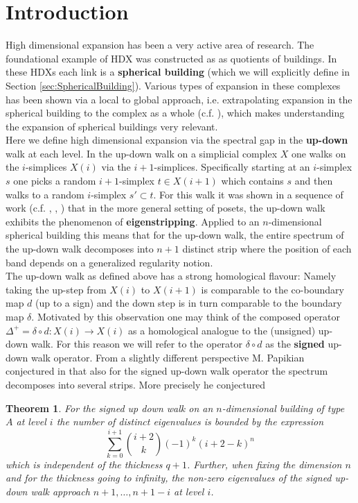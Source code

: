 \documentclass[11pt]{amsart}
\newtheorem{theorem}{Theorem}[section]
\begin{document}
    \section{Introduction}
    High dimensional expansion  has been a very active area of research. The foundational example of HDX was constructed as \cite{LSV05} as quotients of buildings. In these HDXs each link is a \textbf{spherical building} (which we will explicitly define in Section \ref{sec:SphericalBuilding}). Various types of expansion in these complexes has been shown via a local to global approach, i.e. extrapolating expansion in the spherical building to the complex as a whole (c.f. \cite{EK17}), which makes understanding the expansion of spherical buildings very relevant. \\
    Here we define high dimensional expansion via the spectral gap in the \textbf{up-down} walk at each level. In the up-down walk on a simplicial complex $X$ one walks on the $i$-simplices $X(i)$ via the $i+1$-simplices. Specifically starting at an $i$-simplex $s$ one picks a random $i+1$-simplex $t\in X(i+1)$ which contains $s$ and then walks to a random $i$-simplex $s'\subset t$. For this walk  it was shown in a sequence of work (c.f. \cite{DDFH18}, \cite{KO21b}, \cite{Eigen23}) that in the more general setting of posets, the up-down walk exhibits the phenomenon of \textbf{eigenstripping}. Applied to an $n$-dimensional spherical building  this means that for the up-down walk,  the entire spectrum of the up-down walk decomposes into $n+1$ distinct strip where the position of each band depends on a generalized regularity notion.\\
    The up-down walk as defined above has a strong homological flavour: Namely taking the up-step from $X(i)$ to $X(i+1)$ is comparable to the co-boundary map $d$ (up to a sign) and the down step is in turn comparable to the boundary map $\delta$. Motivated by this observation one may think of the composed operator $\Delta^+=\delta \circ d:X(i)\rightarrow X(i)$ as a homological analogue to the (unsigned) up-down walk. For this reason we will refer to the operator $\delta\circ d$ as the \textbf{signed} up-down walk operator. From a slightly different perspective M. Papikian conjectured in \cite{Pap16} that also for the signed up-down walk operator the spectrum decomposes into several strips.  More precisely he conjectured 
    \begin{theorem}
        For the signed up down walk on an $n$-dimensional building of type $A$ at level $i$ the number of distinct eigenvalues is bounded by the expression 
        \begin{equation}
            \sum_{k=0}^{i+1}\binom{i+2}{k} (-1)^k (i+2-k)^n
        \end{equation}
        which is independent of the thickness $q+1$. Further, when fixing the dimension $n$ and for the thickness going to infinity, the non-zero eigenvalues of the signed up-down walk approach $n+1,\dots, n+1-i$ at level $i$. 
    \end{theorem}
\end{document}
